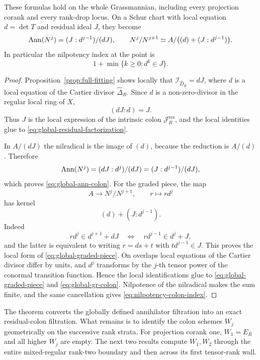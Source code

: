 \begin{theorem}
These formulas hold on the whole Grassmannian, including every
projection corank and every rank-drop locus.  On a Schur chart with
local equation \(d=\det T\) and residual ideal \(J\), they become
\begin{equation}\label{eq:local-colon-filtration}
 \operatorname{Ann}(N^j)=(J:d^{j-1})/(dJ),\qquad
 N^j/N^{j+1}\simeq
 A/\bigl((d)+(J:d^{j-1})\bigr).
\end{equation}
In particular the nilpotency index at the point is
\begin{equation}\label{eq:nilpotency-colon-index}
 1+\min\{k\ge0:d^k\in J\}.
\end{equation}
\end{theorem}

\begin{proof}
Proposition~\ref{prop:full-fitting} shows locally that
\(\mathcal I_{\widehat D_R}=dJ\), where \(d\) is a local equation of
the Cartier divisor \(\widehat\Delta_R\).  Since \(d\) is a
non-zero-divisor in the regular local ring of \(X\),
\[
 (dJ:d)=J.
\]
Thus \(J\) is the local expression of the intrinsic colon
\(\mathcal J_R^{\mathrm{res}}\), and the local identities glue to
\eqref{eq:global-residual-factorization}.

In \(A/(dJ)\) the nilradical is the image of \((d)\), because the
reduction is \(A/(d)\).  Therefore
\[
 \operatorname{Ann}(N^j)
 =
 (dJ:d^j)/(dJ)
 =
 (J:d^{j-1})/(dJ),
\]
which proves \eqref{eq:global-ann-colon}.  For the graded piece, the
map
\[
 A\longrightarrow N^j/N^{j+1},\qquad
 r\longmapsto r d^j
\]
has kernel
\[
 (d)+(J:d^{j-1}).
\]
Indeed
\[
 rd^j\in d^{j+1}+dJ
 \quad\Longleftrightarrow\quad
 rd^{j-1}\in d^j+J,
\]
and the latter is equivalent to writing
\(r=ds+t\) with \(td^{j-1}\in J\).  This proves the local form of
\eqref{eq:global-graded-piece}.  On overlaps local equations of the
Cartier divisor differ by units, and \(d^j\) transforms by the
\(j\)-th tensor power of the conormal transition function.  Hence the
local identifications glue to \eqref{eq:global-graded-piece} and
\eqref{eq:global-gr-colon}.  Nilpotence of the nilradical makes the
sum finite, and the same cancellation gives
\eqref{eq:nilpotency-colon-index}.
\end{proof}

The theorem converts the globally defined annihilator filtration into
an exact residual-colon filtration.  What remains is to identify the
colon schemes \(W_j\) geometrically on the successive rank strata.
For projection corank one, \(W_1=E_R\) and all higher \(W_j\) are
empty.  The next two results compute \(W_1,W_2\) through the entire
mixed-regular rank-two boundary and then across its first tensor-rank
wall.

